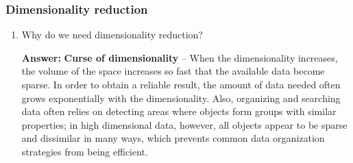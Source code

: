 \documentclass{article}
\newenvironment{QandA}{\begin{enumerate}[label=\arabic*.]}{\end{enumerate}}
\newenvironment{answer}{\par\normalfont \textbf{Answer:}}{}
\begin{document}
\subsubsection{Dimensionality reduction}
\begin{QandA}
    \item Why do we need dimensionality reduction?
    \begin{answer}
        \textbf{Curse of dimensionality} -- When the dimensionality increases, the volume of the space increases so fast that the available data become sparse. In order to obtain a reliable result, the amount of data needed often grows exponentially with the dimensionality. Also, organizing and searching data often relies on detecting areas where objects form groups with similar properties; in high dimensional data, however, all objects appear to be sparse and dissimilar in many ways, which prevents common data organization strategies from being efficient.
    \end{answer}


\end{QandA}
\end{document}
